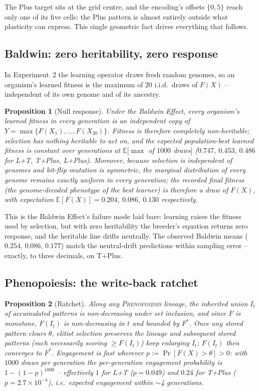 \documentclass[11pt]{article}
\newtheorem{proposition}{Proposition}
\newcommand{\Pheno}{\textsc{Phenopoiesis}}
\begin{document}
The Plus target sits at the grid centre, and the encoding's offsets
$\{0,5\}$ reach only one of its five cells: the Plus pattern is almost
entirely outside what plasticity can express. This single geometric fact
drives everything that follows.

\subsection{Baldwin: zero heritability, zero response}

In Experiment~2 the learning operator draws fresh random genomes, so an
organism's learned fitness is the maximum of 20 i.i.d.\ draws of $F(X)$ --
independent of its own genome and of its ancestry.

\begin{proposition}[Null response]\label{prop:baldwin}
Under the Baldwin Effect, every organism's learned fitness in every
generation is an independent copy of $Y = \max\{F(X_1),\dots,F(X_{20})\}$.
Fitness is therefore completely non-heritable; selection has nothing
heritable to act on, and the expected population-best learned fitness is
constant over generations at $\mathbb{E}[\max$ of $1000$ draws$]$
($0.747$, $0.453$, $0.486$ for L+T, T+Plus, L+Plus). Moreover, because
selection is independent of genomes and bit-flip mutation is symmetric, the
marginal distribution of every genome remains exactly uniform in every
generation; the recorded final fitness (the genome-decoded phenotype of the
best learner) is therefore a draw of $F(X)$, with expectation
$\mathbb{E}[F(X)] = 0.204$, $0.086$, $0.130$ respectively.
\end{proposition}

This is the Baldwin Effect's failure mode laid bare: learning raises the
fitness used by selection, but with zero heritability the breeder's equation
returns zero response, and the heritable line drifts neutrally. The observed
Baldwin means ($0.254$, $0.086$, $0.177$) match the neutral-drift
predictions within sampling error -- exactly, to three decimals, on T+Plus.

\subsection{Phenopoiesis: the write-back ratchet}

\begin{proposition}[Ratchet]\label{prop:ratchet}
Along any \Pheno{} lineage, the inherited union $I_t$ of accumulated patterns
is non-decreasing under set inclusion, and since $F$ is monotone,
$F(I_t)$ is non-decreasing in $t$ and bounded by $F^*$. Once any stored
pattern clears $\theta$, elitist selection preserves the lineage and
subsequent stored patterns (each necessarily scoring $\ge F(I_t)$) keep
enlarging $I_t$; $F(I_t)$ then converges to $F^*$. Engagement is fast
wherever $p := \Pr[F(X) > \theta] > 0$: with $1000$ draws per generation the
per-generation engagement probability is $1 - (1-p)^{1000}$ -- effectively
$1$ for L+T ($p = 0.049$) and $0.24$ for T+Plus ($p = 2.7 \times 10^{-4}$),
i.e.\ expected engagement within $\sim$4 generations.
\end{proposition}
\end{document}
